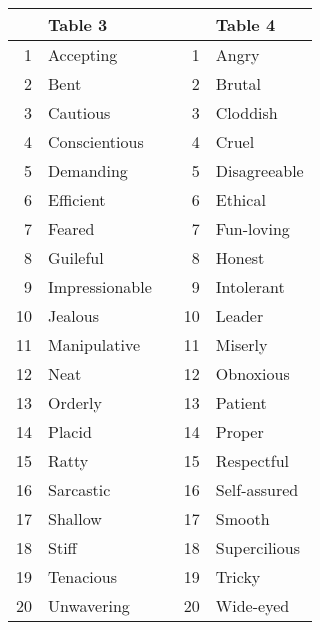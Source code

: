 \documentclass[12pt]{article}
\begin{document}
\begin{tabular}{r|l l r|l}
 & Table 3 & & & Table 4 \\\hline
 1 & Accepting & &  1 & Angry\\
 2 & Bent & &  2 & Brutal\\
 3 & Cautious & &  3 & Cloddish\\
 4 & Conscientious & &  4 & Cruel\\
 5 & Demanding & &  5 & Disagreeable\\
 6 & Efficient & &  6 & Ethical\\
 7 & Feared & &  7 & Fun-loving\\
 8 & Guileful & &  8 & Honest\\
 9 & Impressionable & &  9 & Intolerant\\
10 & Jealous & & 10 & Leader\\
11 & Manipulative & & 11 & Miserly\\
12 & Neat & & 12 & Obnoxious\\
13 & Orderly & & 13 & Patient\\
14 & Placid & & 14 & Proper\\
15 & Ratty & & 15 & Respectful\\
16 & Sarcastic & & 16 & Self-assured\\
17 & Shallow & & 17 & Smooth\\
18 & Stiff & & 18 & Supercilious\\
19 & Tenacious & & 19 & Tricky\\
20 & Unwavering & & 20 & Wide-eyed\\
\end{tabular}
\end{document}

